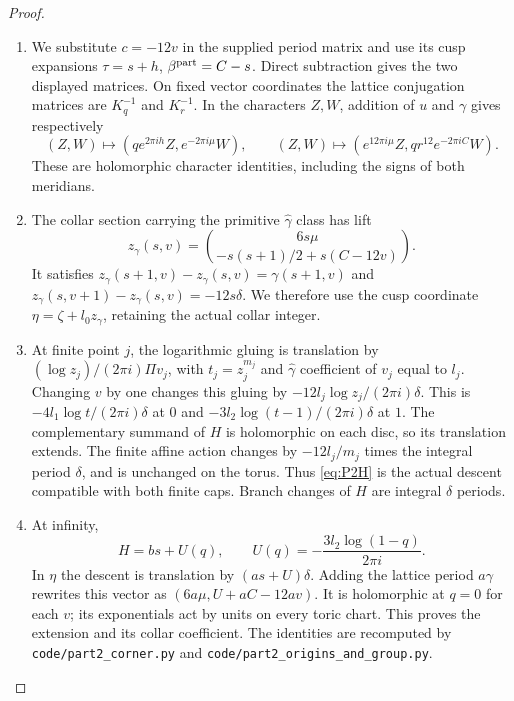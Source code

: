 \begin{proof}
\begin{enumerate}[label=\arabic*.,leftmargin=*]
\item We substitute $c=-12v$ in the supplied period matrix and use its cusp expansions $\tau=s+h$, $\beta^{\rm part}=C-s$. Direct subtraction gives the two displayed matrices. On fixed vector coordinates the lattice conjugation matrices are $K_q^{-1}$ and $K_r^{-1}$. In the characters $Z,W$, addition of $u$ and $\gamma$ gives respectively
\[
 (Z,W)\mapsto(qe^{2\pi ih}Z,e^{-2\pi i\mu}W),\qquad
 (Z,W)\mapsto(e^{12\pi i\mu}Z,qr^{12}e^{-2\pi iC}W).
\]
These are holomorphic character identities, including the signs of both meridians.

\item The collar section carrying the primitive $\widehat\gamma$ class has lift
\begin{equation}\label{eq:P2zg}
 z_\gamma(s,v)=\binom{6s\mu}{-s(s+1)/2+s(C-12v)}.
\end{equation}
It satisfies $z_\gamma(s+1,v)-z_\gamma(s,v)=\gamma(s+1,v)$ and $z_\gamma(s,v+1)-z_\gamma(s,v)=-12s\delta$. We therefore use the cusp coordinate $\eta=\zeta+l_0z_\gamma$, retaining the actual collar integer.

\item At finite point $j$, the logarithmic gluing is translation by $(\log z_j)/(2\pi i)\Pi v_j$, with $t_j=z_j^{m_j}$ and $\widehat\gamma$ coefficient of $v_j$ equal to $l_j$. Changing $v$ by one changes this gluing by $-12l_j\log z_j/(2\pi i)\delta$. This is $-4l_1\log t/(2\pi i)\delta$ at $0$ and $-3l_2\log(t-1)/(2\pi i)\delta$ at $1$. The complementary summand of $H$ is holomorphic on each disc, so its translation extends. The finite affine action changes by $-12l_j/m_j$ times the integral period $\delta$, and is unchanged on the torus. Thus \eqref{eq:P2H} is the actual descent compatible with both finite caps. Branch changes of $H$ are integral $\delta$ periods.

\item At infinity,
\[
 H=bs+U(q),\qquad U(q)=-\frac{3l_2\log(1-q)}{2\pi i}.
\]
In $\eta$ the descent is translation by $(as+U)\delta$. Adding the lattice period $a\gamma$ rewrites this vector as $(6a\mu,U+aC-12av)$. It is holomorphic at $q=0$ for each $v$; its exponentials act by units on every toric chart. This proves the extension and its collar coefficient. The identities are recomputed by \texttt{code/part2\_corner.py} and \texttt{code/part2\_origins\_and\_group.py}.
\end{enumerate}
\end{proof}

